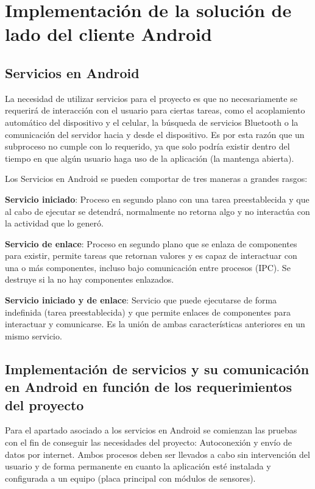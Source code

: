 \chapter{Implementación de la solución de lado del cliente Android}\label{servicios}

\section{Servicios en Android}

La necesidad de utilizar servicios para el proyecto es que no necesariamente se requerirá de interacción con el usuario para ciertas tareas, como el acoplamiento automático del dispositivo y el celular, la búsqueda de servicios Bluetooth o la comunicación del servidor hacia y desde el dispositivo. Es por esta razón que un subproceso no cumple con lo requerido, ya que solo podría existir dentro del tiempo en que algún usuario haga uso de la aplicación (la mantenga abierta).

Los Servicios\cite{services} en Android se pueden comportar de tres maneras a grandes rasgos:
	
	\textbf{Servicio iniciado}: Proceso en segundo plano con una tarea preestablecida y que al cabo de ejecutar se detendrá, normalmente no retorna algo y no interactúa con la actividad que lo generó.

	\textbf{Servicio de enlace}: Proceso en segundo plano que se enlaza de componentes para existir, permite tareas que retornan valores y es capaz de interactuar con una o más componentes, incluso bajo comunicación entre procesos (IPC). Se destruye si la no hay componentes enlazados.

	\textbf{Servicio iniciado y de enlace}: Servicio que puede ejecutarse de forma indefinida (tarea preestablecida) y que permite enlaces de componentes para interactuar y comunicarse. Es la unión de ambas características anteriores en un mismo servicio.


\newpage

\section{Implementación de servicios y su comunicación en Android en función de los requerimientos del proyecto}

Para el apartado asociado a los servicios en Android se comienzan las pruebas con el fin de conseguir las necesidades del proyecto: Autoconexión y envío de datos por internet. Ambos procesos deben ser llevados a cabo sin intervención del usuario y de forma permanente en cuanto la aplicación esté instalada y configurada a un equipo (placa principal con módulos de sensores). \newline


